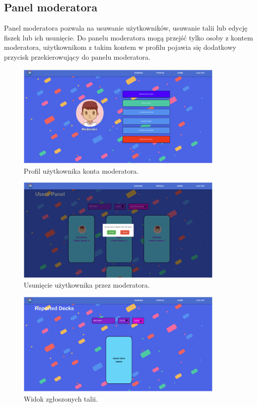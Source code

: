 \subsection{Panel moderatora}
Panel moderatora pozwala na usuwanie użytkowników, usuwanie talii lub edycję fiszek lub ich usunięcie. Do panelu moderatora mogą przejść tylko osoby z kontem moderatora, użytkownikom z takim kontem w profilu pojawia się dodatkowy przycisk przekierowujący do panelu moderatora.


\begin{figure}[H]
    \centering
    \includegraphics[width=0.9\textwidth]{chapters/chapter_10/images_web/web_moderator_profile}
    \caption{Profil użytkownika konta moderatora.}
    \label{img:web_moderator_profile}
\end{figure}


\begin{figure}[H]
    \centering
    \includegraphics[width=0.9\textwidth]{chapters/chapter_10/images_web/web_moderator_delete_user}
    \caption{Usunięcie użytkownika przez moderatora.}
    \label{img:web_moderator_delete_user}
\end{figure}


\begin{figure}[H]
    \centering
    \includegraphics[width=0.9\textwidth]{chapters/chapter_10/images_web/web_reported_decks}
    \caption{Widok zgłoszonych talii.}
    \label{img:web_reported_decks}
\end{figure}


